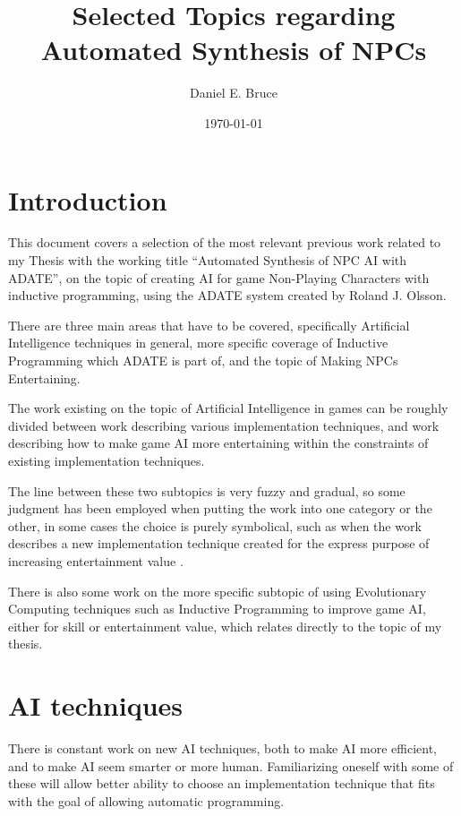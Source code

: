 \documentclass[]{report}
\begin{document}
\title{Selected Topics regarding Automated Synthesis of NPCs}
\author{Daniel E. Bruce}
\date{\today}
\maketitle

\tableofcontents


\chapter{Introduction}
\label{cha:introduction}

This document covers a selection of the most relevant previous work related to
my Thesis with the working title ``Automated Synthesis of NPC AI with ADATE'',
on the topic of creating AI for game Non-Playing Characters with inductive
programming, using the ADATE system created by Roland J. Olsson.

There are three main areas that have to be covered, specifically Artificial
Intelligence techniques in general, more specific coverage of Inductive
Programming which ADATE is part of, and the topic of Making NPCs Entertaining.

The work existing on the topic of Artificial Intelligence in games can be
roughly divided between work describing various implementation techniques, and
work describing how to make game AI more entertaining within the constraints of
existing implementation techniques.

The line between these two subtopics is very fuzzy and gradual, so some judgment
has been employed when putting the work into one category or the other, in some
cases the choice is purely symbolical, such as when the work describes a new
implementation technique created for the express purpose of increasing
entertainment value \citep[for example][]{khoo2002efficient}.

There is also some work on the more specific subtopic of using Evolutionary
Computing techniques such as Inductive Programming to improve game AI, either
for skill or entertainment value, which relates directly to the topic of my
thesis.

\chapter{AI techniques}
\label{cha:ai-techniques}

There is constant work on new AI techniques, both to make AI more efficient, and
to make AI seem smarter or more human. Familiarizing oneself with some of these
will allow better ability to choose an implementation technique that fits with
the goal of allowing automatic programming.
\end{document}
